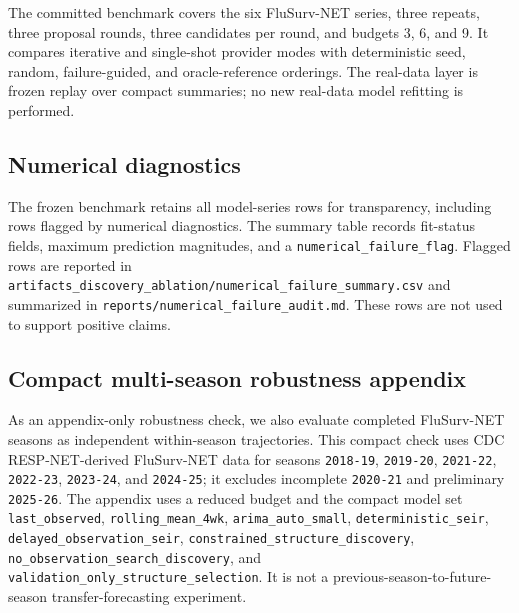The committed benchmark covers the six FluSurv-NET series, three repeats,
three proposal rounds, three candidates per round, and budgets \num{3},
\num{6}, and \num{9}. It compares iterative and single-shot provider modes
with deterministic seed, random, failure-guided, and oracle-reference
orderings. The real-data layer is frozen replay over compact summaries; no new
real-data model refitting is performed.

\subsection{Numerical diagnostics}

The frozen benchmark retains all model-series rows for transparency, including
rows flagged by numerical diagnostics. The summary table records fit-status
fields, maximum prediction magnitudes, and a
\texttt{numerical\_failure\_flag}. Flagged rows are reported in
\texttt{artifacts\_discovery\_ablation/numerical\_failure\_summary.csv} and
summarized in \texttt{reports/numerical\_failure\_audit.md}. These rows are not
used to support positive claims.

\subsection{Compact multi-season robustness appendix}

As an appendix-only robustness check, we also evaluate completed FluSurv-NET
seasons as independent within-season trajectories. This compact check uses CDC
RESP-NET-derived FluSurv-NET data for seasons \texttt{2018-19},
\texttt{2019-20}, \texttt{2021-22}, \texttt{2022-23}, \texttt{2023-24}, and
\texttt{2024-25}; it excludes incomplete \texttt{2020-21} and preliminary
\texttt{2025-26}. The appendix uses a reduced budget and the compact model set
\texttt{last\_observed}, \texttt{rolling\_mean\_4wk},
\texttt{arima\_auto\_small}, \texttt{deterministic\_seir},
\texttt{delayed\_observation\_seir},
\texttt{constrained\_structure\_discovery},
\texttt{no\_observation\_search\_discovery}, and
\texttt{validation\_only\_structure\_selection}. It is not a
previous-season-to-future-season transfer-forecasting experiment.
